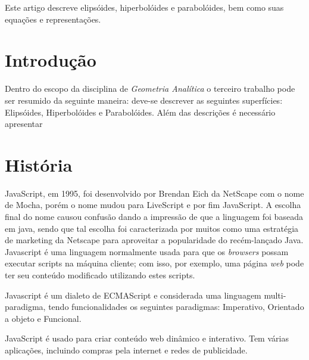 \documentclass[
	article,			%
	11pt,				%
	oneside,			%
	a4paper,			%
	english,			%
	brazil,				%
	]{abntex2}
\begin{document}
\frenchspacing 

\maketitle

\begin{resumoumacoluna}
    
	Este artigo descreve elipsóides, hiperbolóides e parabolóides, bem como suas
	equações e representações.

 \vspace{\onelineskip}
 
 \noindent
\end{resumoumacoluna}

\textual

    \section*{Introdução}

		Dentro do escopo da disciplina de \emph{Geometria Analítica} o terceiro
		trabalho pode ser resumido da seguinte maneira: deve-se descrever as
		seguintes superfícies:  Elipsóides, Hiperbolóides e Parabolóides. Além
		das descrições é necessário apresentar 

    \section{História}

        JavaScript, em 1995, foi desenvolvido por Brendan Eich da NetScape com o nome de Mocha, porém o nome mudou para LiveScript e por fim JavaScript.  A escolha final do nome causou confusão dando a impressão de que a linguagem foi baseada em java, sendo que tal escolha foi caracterizada por muitos como uma estratégia de marketing da Netscape para aproveitar a popularidade do recém-lançado Java. Javascript é uma linguagem normalmente usada para que os \emph{browsers} possam executar scripts na máquina cliente; com isso, por exemplo, uma página \emph{web} pode ter seu conteúdo modificado utilizando estes scripts. 
    
        Javascript é um dialeto de ECMAScript e considerada uma linguagem multi-paradigma, tendo funcionalidades os seguintes paradigmas: Imperativo, Orientado a objeto e Funcional.
   
        JavaScript é usado para criar conteúdo web dinâmico e interativo. Tem várias aplicações, incluindo compras pela internet e redes de publicidade.
    
\end{document}
